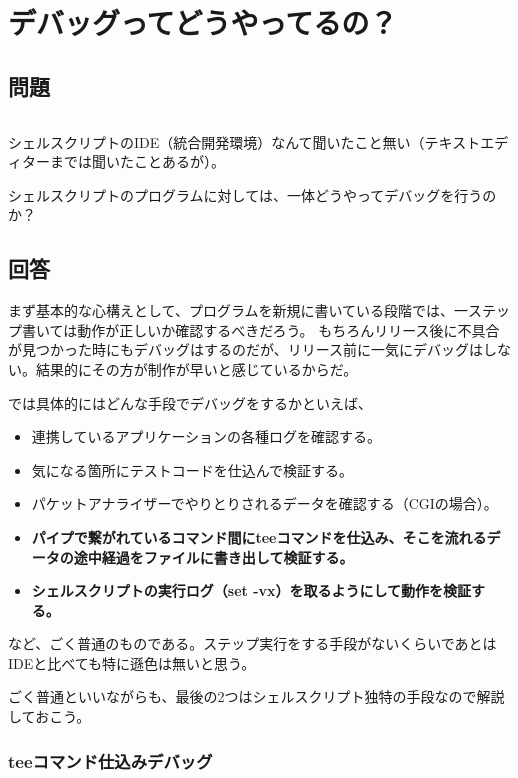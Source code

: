 \section{デバッグってどうやってるの？}
\label{recipe:debug}

\subsection*{問題}
\noindent
$\!\!\!\!\!$
\begin{grshfboxit}{160.0mm}
	シェルスクリプトのIDE（統合開発環境）なんて聞いたこと無い（テキストエディターまでは聞いたことあるが）。

	シェルスクリプトのプログラムに対しては、一体どうやってデバッグを行うのか？
\end{grshfboxit}

\subsection*{回答}

まず基本的な心構えとして、プログラムを新規に書いている段階では、一ステップ書いては動作が正しいか確認するべきだろう。
もちろんリリース後に不具合が見つかった時にもデバッグはするのだが、リリース前に一気にデバッグはしない。結果的にその方が制作が早いと感じているからだ。

では具体的にはどんな手段でデバッグをするかといえば、
\begin{itemize}
  \item 連携しているアプリケーションの各種ログを確認する。
  \item 気になる箇所にテストコードを仕込んで検証する。
  \item パケットアナライザーでやりとりされるデータを確認する（CGIの場合）。
  \item \textbf{パイプで繋がれているコマンド間にteeコマンドを仕込み、そこを流れるデータの途中経過をファイルに書き出して検証する。}
  \item \textbf{シェルスクリプトの実行ログ（set -vx）を取るようにして動作を検証する。}
\end{itemize}
など、ごく普通のものである。ステップ実行をする手段がないくらいであとはIDEと比べても特に遜色は無いと思う。

ごく普通といいながらも、最後の2つはシェルスクリプト独特の手段なので解説しておこう。

\subsubsection*{teeコマンド仕込みデバッグ}

